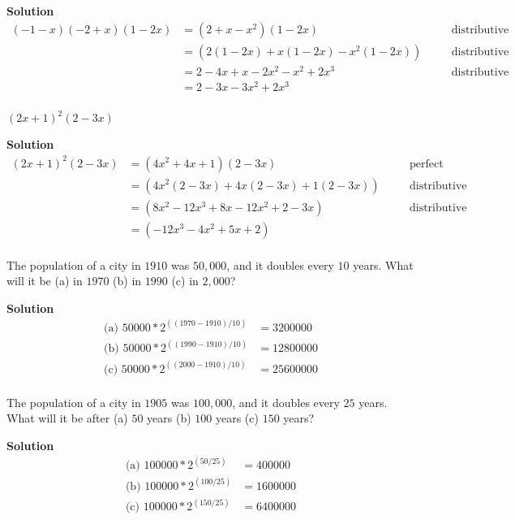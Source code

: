 \documentclass[6pt]{article}
\begin{document}
\textbf{Solution}
\begin{align*}
(-1 - x)(-2 + x)(1 - 2x) &= (2 + x - x^2)(1 - 2x) && \quad \text{distributive} \\
&= (2(1 - 2x) + x(1 - 2x) - x^2(1 - 2x)) && \quad \text{distributive} \\
&= 2 - 4x + x - 2x^2 - x^2 + 2x^3 && \quad \text{distributive} \\
&= 2 - 3x - 3x^2 + 2x^3 && \quad \text{} \\
\end{align*}

\begin{tcolorbox}[title=Problem 29, breakable]
${(2x + 1)}^2(2 - 3x)$
\end{tcolorbox}

\textbf{Solution}
\begin{align*}
{(2x + 1)}^2(2 - 3x) &= (4x^2 +4x + 1)(2 - 3x) && \quad \text{perfect square} \\
&= (4x^2(2 - 3x) + 4x(2 - 3x) + 1(2 - 3x)) && \quad \text{distributive} \\
&= (8x^2 -12x^3 + 8x - 12x^2 + 2 - 3x) && \quad \text{distributive} \\
&= (-12x^3 - 4x^2 + 5x + 2) && \quad \text{} \\
\end{align*}

\begin{tcolorbox}[title=Problem 30, breakable]
The population of a city in $1910$ was $50,000$, and it doubles every $10$
years. What will it be (a) in $1970$ (b) in $1990$ (c) in $2,000$?
\end{tcolorbox}

\textbf{Solution}
\begin{align*}
\text{(a) } 50000 * 2^{((1970-1910) / 10)} &= 3200000 \\
\text{(b) } 50000 * 2^{((1990-1910) / 10)} &= 12800000 \\
\text{(c) } 50000 * 2^{((2000-1910) / 10)} &= 25600000 \\
\end{align*}


\begin{tcolorbox}[title=Problem 31, breakable]
The population of a city in $1905$ was $100,000$, and it doubles every $25$
years. What will it be after (a) $50$ years (b) $100$ years (c) $150$ years?
\end{tcolorbox}

\textbf{Solution}
\begin{align*}
\text{(a) } 100000 * 2^{(50 / 25)} &= 400000 \\
\text{(b) } 100000 * 2^{(100 / 25)} &= 1600000 \\
\text{(c) } 100000 * 2^{(150 / 25)} &= 6400000 \\
\end{align*}
\end{document}
